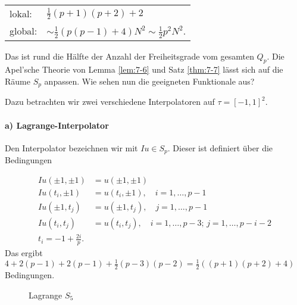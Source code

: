 \begin{tabular}[ht!]{l l}
  lokal: & $\frac 12 (p+1)(p+2) + 2$\\
  global: & $\sim \frac 12 (p(p-1) +4)N^{2} \sim \frac 12 p^{2} N^{2}$.  
\end{tabular}

Das ist rund die Hälfte der Anzahl der Freiheitsgrade vom gesamten $Q_{p}$. Die Apel'sche Theorie von Lemma \ref{lem:7-6} und Satz \ref{thm:7-7} lässt sich auf die Räume $S_{p}$ anpassen. Wie sehen nun die geeigneten Funktionale aus?

Dazu betrachten wir zwei verschiedene Interpolatoren auf $\tau = [-1, 1]^{2}$. 

\paragraph{a) Lagrange-Interpolator}
\label{sec:lagr-interp}

Den Interpolator bezeichnen wir mit $Iu \in S_{p}$. Dieser ist definiert über die Bedingungen 

\begin{align*}
Iu (\pm 1, \pm 1) &= u(\pm 1, \pm1)\\
Iu (t_{i}, \pm 1) &= u(t_{i}, \pm1), \quad i = 1, \dots, p-1\\
Iu (\pm 1, t_{j}) &= u(\pm 1, t_{j}), \quad j = 1, \dots, p-1\\
Iu (t_{i}, t_{j}) &= u(t_{i}, t_{j}), \quad i = 1, \dots, p-3; \, j = 1, \dots, p-i-2\\
t_{i} = -1 + \frac {2i}p. 
\end{align*}
Das ergibt $4 + 2(p-1)+ 2(p-1)+ \frac 12 (p-3)(p-2) = \frac 12 ((p+1)(p+2) +4)$ Bedingungen. 

\begin{figure}[hb!]
  \centering
  \caption{Lagrange $S_5$}
  \label{fig:lagrange_s5}
\end{figure}


